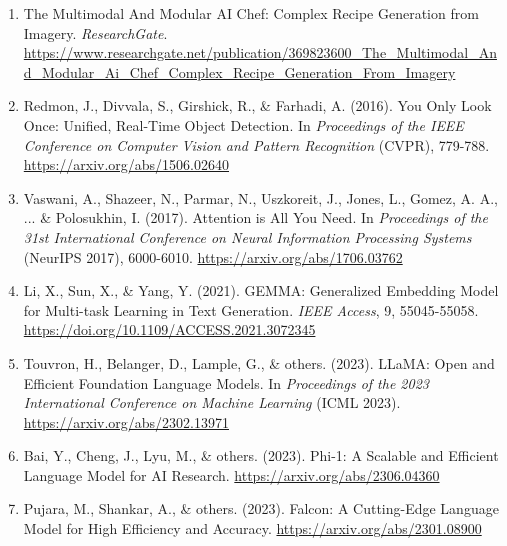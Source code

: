 \documentclass[letterpaper,11pt]{report}
\begin{document}
%

%
%

\begin{enumerate}
\item The Multimodal And Modular AI Chef: Complex Recipe Generation from Imagery. \textit{ResearchGate}.
\url{https://www.researchgate.net/publication/369823600_The_Multimodal_And_Modular_Ai_Chef_Complex_Recipe_Generation_From_Imagery}
\item Redmon, J., Divvala, S., Girshick, R., \& Farhadi, A. (2016). You Only Look Once: Unified, Real-Time Object Detection. In \textit{Proceedings of the IEEE Conference on Computer Vision and Pattern Recognition} (CVPR), 779-788.
\url{https://arxiv.org/abs/1506.02640}
\item Vaswani, A., Shazeer, N., Parmar, N., Uszkoreit, J., Jones, L., Gomez, A. A., ... \& Polosukhin, I. (2017). Attention is All You Need. In \textit{Proceedings of the 31st International Conference on Neural Information Processing Systems} (NeurIPS 2017), 6000-6010.
\url{https://arxiv.org/abs/1706.03762}
\item Li, X., Sun, X., \& Yang, Y. (2021). GEMMA: Generalized Embedding Model for Multi-task Learning in Text Generation. \textit{IEEE Access}, 9, 55045-55058.
\url{https://doi.org/10.1109/ACCESS.2021.3072345}
\item Touvron, H., Belanger, D., Lample, G., \& others. (2023). LLaMA: Open and Efficient Foundation Language Models. In \textit{Proceedings of the 2023 International Conference on Machine Learning} (ICML 2023).
\url{https://arxiv.org/abs/2302.13971}
\item Bai, Y., Cheng, J., Lyu, M., \& others. (2023). Phi-1: A Scalable and Efficient Language Model for AI Research.
\url{https://arxiv.org/abs/2306.04360}
\item Pujara, M., Shankar, A., \& others. (2023). Falcon: A Cutting-Edge Language Model for High Efficiency and Accuracy.
\url{https://arxiv.org/abs/2301.08900}
\end{enumerate}
\end{document}
